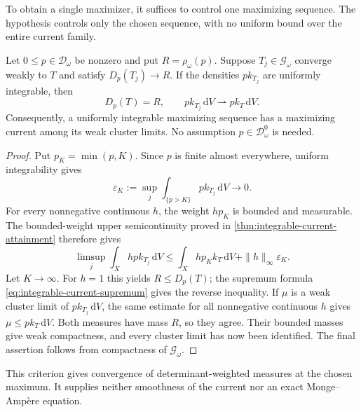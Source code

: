 To obtain a single maximizer, it suffices to control one maximizing sequence. The hypothesis controls only the chosen sequence, with no uniform bound over the entire current family.

\begin{proposition}\label{prop:selected-gauduchon-attainment}
Let $0\leq p\in\mathcal D_\omega$ be nonzero and put $R=\rho_\omega(p)$. Suppose $T_j\in\mathscr G_\omega$ converge weakly to $T$ and satisfy $D_p(T_j)\to R$. If the densities $p k_{T_j}$ are uniformly integrable, then
\[
 D_p(T)=R,\qquad
 p k_{T_j}\,\mathrm{d}V\rightharpoonup p k_T\,\mathrm{d}V.
\]
Consequently, a uniformly integrable maximizing sequence has a maximizing current among its weak cluster limits. No assumption $p\in\mathcal D_\omega^0$ is needed.
\end{proposition}
\begin{proof}
Put $p_K=\min(p,K)$. Since $p$ is finite almost everywhere, uniform integrability gives
\[
 \varepsilon_K:=\sup_j\int_{\{p>K\}}p k_{T_j}\,\mathrm{d}V
       \longrightarrow0.
\]
For every nonnegative continuous $h$, the weight $hp_K$ is bounded and measurable. The bounded-weight upper semicontinuity proved in \cref{thm:integrable-current-attainment} therefore gives
\[
 \limsup_j\int_Xhp k_{T_j}\,\mathrm{d}V
 \leq \int_Xhp_K k_T\,\mathrm{d}V
                   +\|h\|_\infty\varepsilon_K.
\]
Let $K\to\infty$. For $h=1$ this yields $R\leq D_p(T)$; the supremum formula \eqref{eq:integrable-current-supremum} gives the reverse inequality. If $\mu$ is a weak cluster limit of $p k_{T_j}\,\mathrm{d}V$, the same estimate for all nonnegative continuous $h$ gives $\mu\leq p k_T\,\mathrm{d}V$. Both measures have mass $R$, so they agree. Their bounded masses give weak compactness, and every cluster limit has now been identified. The final assertion follows from compactness of $\mathscr G_\omega$.
\end{proof}

This criterion gives convergence of determinant-weighted measures at the chosen maximum. It supplies neither smoothness of the current nor an exact Monge--Amp\`ere equation.
